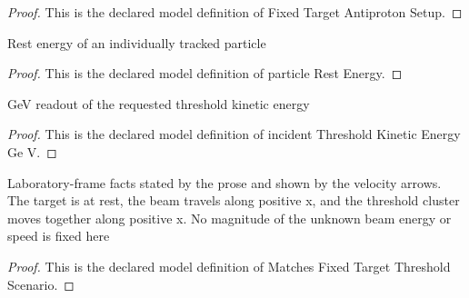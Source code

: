 \begin{proof}
  This is the declared model definition of Fixed Target Antiproton Setup.
\end{proof}
\begin{definition}
  \label{def:physics:phyx-mini-0555:phyxminiproblems-problemphyxmini0555-particlerestenergy}
  Rest energy of an individually tracked particle
\end{definition}
\begin{proof}
  This is the declared model definition of particle Rest Energy.
\end{proof}
\begin{definition}
  \label{def:physics:phyx-mini-0555:phyxminiproblems-problemphyxmini0555-incidentthresholdkineticenergygev}
  GeV readout of the requested threshold kinetic energy
\end{definition}
\begin{proof}
  This is the declared model definition of incident Threshold Kinetic Energy Ge V.
\end{proof}
\begin{definition}
  \label{def:physics:phyx-mini-0555:phyxminiproblems-problemphyxmini0555-matchesfixedtargetthresholdscenario}
  Laboratory-frame facts stated by the prose and shown by the velocity arrows. The target is at rest, the beam travels along positive x, and the threshold cluster moves together along positive x. No magnitude of the unknown beam energy or speed is fixed here
\end{definition}
\begin{proof}
  This is the declared model definition of Matches Fixed Target Threshold Scenario.
\end{proof}
